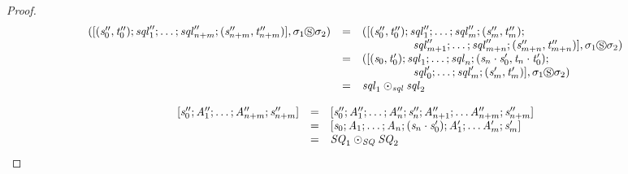 \documentclass[numbers]{sigplanconf}
\begin{document}
\begin{proof}
  \[
    \begin{array}{rcl}
      ([(\mathit{s}_0'',\mathit{t}_0'');\mathit{sql}_1'';
      \ldots;
      \mathit{sql}_{n+m}'';(\mathit{s}_{n+m}'',\mathit{t}_{n+m}'')],
      \sigma_1\circledS\sigma_2)
      & = & ([(\mathit{s}_0'',\mathit{t}_0'');\mathit{sql}_1'';
            \ldots;\mathit{sql}_m'';(\mathit{s}_m'',\mathit{t}_m'');\\
      & & \hspace*{4.5em}\mathit{sql}_{m+1}'';
          \ldots;\mathit{sql}_{m+n}'';(\mathit{s}_{m+n}'',\mathit{t}_{m+n}'')],
          \sigma_1\circledS\sigma_2)\\
      & = & ([(\mathit{s}_0,\mathit{t}_0');\mathit{sql}_1;
            \ldots;\mathit{sql}_n;(\mathit{s}_n\cdot\mathit{s}_0',\mathit{t}_n\cdot\mathit{t}_0');\\
      & & \hspace*{4.5em}\mathit{sql}_0';
          \ldots;\mathit{sql}_m';(\mathit{s}_m',\mathit{t}_m')],
          \sigma_1\circledS\sigma_2)\\
      & = & \mathit{sql}_1\odot_{\mathit{sql}}\mathit{sql}_2
    \end{array}
  \]


  \[
    \begin{array}{rcl}
      [\mathit{s}_0'';\mathit{A}_1'';\ldots;\mathit{A}_{n+m}'';\mathit{s}_{n+m}'']
      & = & [\mathit{s}_0'';\mathit{A}_1'';\ldots;\mathit{A}_n'';\mathit{s}_n'';\mathit{A}_{n+1}'';
            \ldots\mathit{A}_{n+m}'';\mathit{s}_{n+m}'']\\
      & = & [\mathit{s}_0;\mathit{A}_1;\ldots;\mathit{A}_n;(\mathit{s}_n\cdot\mathit{s}_0');\mathit{A}_1';
            \ldots\mathit{A}_m';\mathit{s}_m']\\
      & = & \mathit{SQ}_1\odot_{\mathit{SQ}}\mathit{SQ}_2
    \end{array}
  \]



\end{proof}
\end{document}
